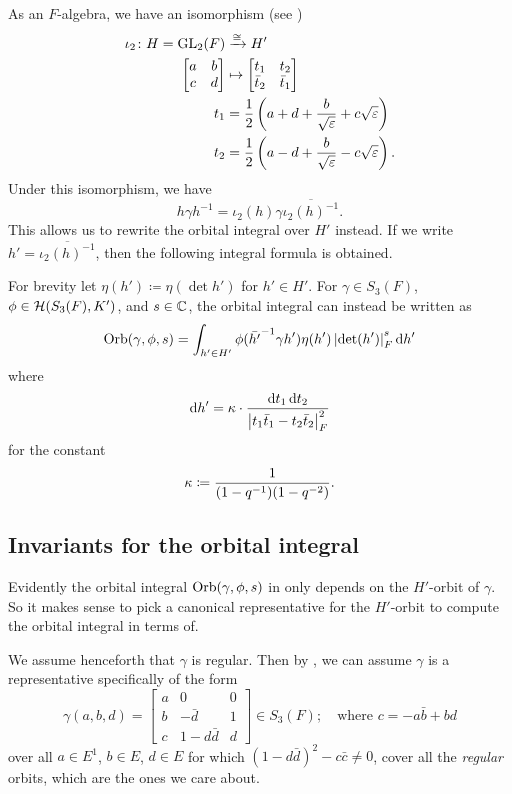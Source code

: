 As an $F$-algebra, we have an isomorphism (see \cite[\S4.1]{ref:AFL})
\begin{align*}
  \iota_2 \colon H = \operatorname{GL}_2(F)
  &\xrightarrow{\cong} H' \\
  \begin{bmatrix} a & b \\ c & d \end{bmatrix}
  &\mapsto \begin{bmatrix} t_1 & t_2 \\ \bar t_2 & \bar t_1 \end{bmatrix} \\
  t_1 &= \frac{1}{2}\left( a + d + \frac{b}{\sqrt{\varepsilon}} + c\sqrt{\varepsilon} \right) \\
  t_2 &= \frac{1}{2}\left( a - d + \frac{b}{\sqrt{\varepsilon}} - c\sqrt{\varepsilon} \right).
\end{align*}
Under this isomorphism, we have
\[ h \gamma h^{-1} = \iota_2(h) \gamma \overline{\iota_2(h)^{-1}}. \]
This allows us to rewrite the orbital integral over $H'$ instead.
If we write $h' = \overline{\iota_2(h)^{-1}}$,
then the following integral formula is obtained.
\begin{proposition}
  \label{prop:orbital_over_H_prime}
  For brevity let $\eta(h') \coloneqq \eta(\det h')$ for $h' \in H'$.
  For $\gamma \in S_3(F)$, $\phi \in \mathcal H(S_3(F), K')$, and $s \in \mathbb C$,
  the orbital integral can instead be written as
  \[ \Orb(\gamma, \phi, s) =
    \int_{h' \in H'} \phi(\bar{h'}\inv \gamma h') \eta(h')
    \left\lvert \det(h') \right\rvert_F^{s} \odif{h'} \]
  where
  \[ \odif{h'} = \kappa \cdot \frac{\odif t_1 \odif t_2}
    {\left\lvert t_1 \bar t_1 - t_2 \bar t_2 \right\rvert_F^2} \]
  for the constant
  \[ \kappa \coloneqq \frac{1}{(1-q^{-1})(1-q^{-2})}. \]
\end{proposition}

\subsection{Invariants for the orbital integral}
Evidently the orbital integral $\operatorname{Orb}(\gamma, \phi, s)$ in 
only depends on the $H'$-orbit of $\gamma$.
So it makes sense to pick a canonical representative for the $H'$-orbit to compute
the orbital integral in terms of.

We assume henceforth that $\gamma$ is regular.
Then by \cite[Proposition 4.1]{ref:AFL},
we can assume $\gamma$ is a representative specifically of the form
\[ \gamma(a,b,d) =
  \begin{bmatrix}
    a & 0 & 0 \\
    b & - \bar d & 1 \\
    c & 1 - d \bar d & d
  \end{bmatrix}
  \in S_3(F); \quad \text{where $c = -a \bar b + b d$} \]
over all $a \in E^1$, $b \in E$, $d \in E$ for which $(1-d\bar d)^2 - c \bar c \neq 0$,
cover all the \emph{regular} orbits, which are the ones we care about.

